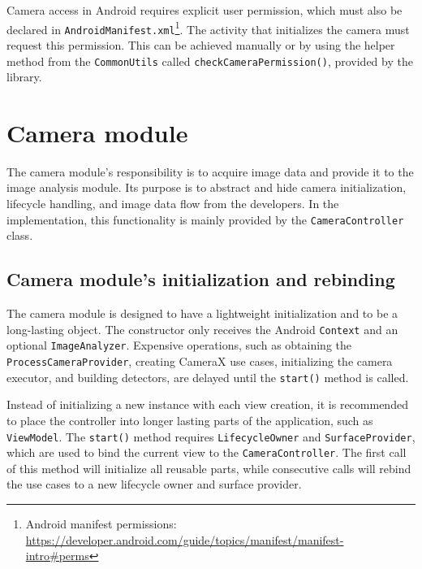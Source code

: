 Camera access in Android requires explicit user permission, which must also be declared in \texttt{AndroidManifest.xml}\footnote{Android manifest permissions: \url{https://developer.android.com/guide/topics/manifest/manifest-intro\#perms}}. The activity that initializes the camera must request this permission. This can be achieved manually or by using the helper method from the \texttt{CommonUtils} called \texttt{checkCameraPermission()}, provided by the library.





\section{Camera module}
\label{CameraModule}
The camera module's responsibility is to acquire image data and provide it to the image analysis module. Its purpose is to abstract and hide camera initialization, lifecycle handling, and image data flow from the developers. In the implementation, this functionality is mainly provided by the \texttt{CameraController} class.

\subsection{Camera module's initialization and rebinding}
The camera module is designed to have a lightweight initialization and to be a long-lasting object. The constructor only receives the Android \texttt{Context} and an optional \texttt{ImageAnalyzer}. Expensive operations, such as obtaining the \texttt{ProcessCameraProvider}, creating CameraX use cases, initializing the camera executor, and building detectors, are delayed until the \texttt{start()} method is called.

Instead of initializing a new instance with each view creation, it is recommended to place the controller into longer lasting parts of the application, such as \texttt{ViewModel}. The \texttt{start()} method requires \texttt{LifecycleOwner} and \texttt{SurfaceProvider}, which are used to bind the current view to the \texttt{CameraController}. The first call of this method will initialize all reusable parts, while consecutive calls will rebind the use cases to a new lifecycle owner and surface provider.

